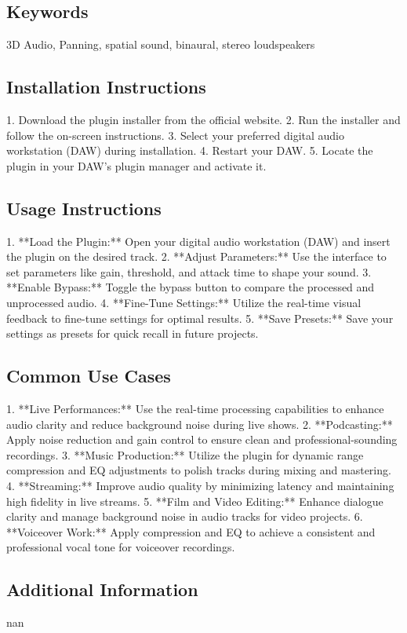 \documentclass[8pt]{article}
\begin{document}
{{{{    \subsection*{Keywords}
    3D Audio, Panning, spatial sound, binaural, stereo loudspeakers

    \subsection*{Installation Instructions}
    1. Download the plugin installer from the official website.
2. Run the installer and follow the on-screen instructions.
3. Select your preferred digital audio workstation (DAW) during installation.
4. Restart your DAW.
5. Locate the plugin in your DAW’s plugin manager and activate it.

    \subsection*{Usage Instructions}
    1. **Load the Plugin:** Open your digital audio workstation (DAW) and insert the plugin on the desired track.
2. **Adjust Parameters:** Use the interface to set parameters like gain, threshold, and attack time to shape your sound.
3. **Enable Bypass:** Toggle the bypass button to compare the processed and unprocessed audio.
4. **Fine-Tune Settings:** Utilize the real-time visual feedback to fine-tune settings for optimal results.
5. **Save Presets:** Save your settings as presets for quick recall in future projects.

    \subsection*{Common Use Cases}
    1. **Live Performances:** Use the real-time processing capabilities to enhance audio clarity and reduce background noise during live shows.
2. **Podcasting:** Apply noise reduction and gain control to ensure clean and professional-sounding recordings.
3. **Music Production:** Utilize the plugin for dynamic range compression and EQ adjustments to polish tracks during mixing and mastering.
4. **Streaming:** Improve audio quality by minimizing latency and maintaining high fidelity in live streams.
5. **Film and Video Editing:** Enhance dialogue clarity and manage background noise in audio tracks for video projects.
6. **Voiceover Work:** Apply compression and EQ to achieve a consistent and professional vocal tone for voiceover recordings.

    \subsection*{Additional Information}
    nan
    

}}}}
\end{document}
